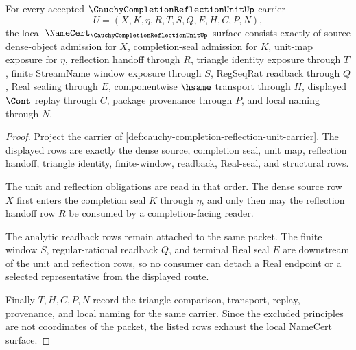 \begin{theorem}
\label{thm:cauchy-completion-reflection-unit-namecert-obligations}
For every accepted $\CauchyCompletionReflectionUnitUp$ carrier
$$
U=(X,K,\eta,R,T,S,Q,E,H,C,P,N),
$$
the local $\NameCert_{\CauchyCompletionReflectionUnitUp}$ surface consists exactly of source dense-object admission for $X$, completion-seal admission for $K$, unit-map exposure for $\eta$, reflection handoff through $R$, triangle identity exposure through $T$, finite StreamName window exposure through $S$, RegSeqRat readback through $Q$, Real sealing through $E$, componentwise $\hsame$ transport through $H$, displayed $\Cont$ replay through $C$, package provenance through $P$, and local naming through $N$.
\end{theorem}
\begin{proof}
Project the carrier of \autoref{def:cauchy-completion-reflection-unit-carrier}. The displayed rows are exactly the dense source, completion seal, unit map, reflection handoff, triangle identity, finite-window, readback, Real-seal, and structural rows.

The unit and reflection obligations are read in that order. The dense source row $X$ first enters the completion seal $K$ through $\eta$, and only then may the reflection handoff row $R$ be consumed by a completion-facing reader.

The analytic readback rows remain attached to the same packet. The finite window $S$, regular-rational readback $Q$, and terminal Real seal $E$ are downstream of the unit and reflection rows, so no consumer can detach a Real endpoint or a selected representative from the displayed route.

Finally $T,H,C,P,N$ record the triangle comparison, transport, replay, provenance, and local naming for the same carrier. Since the excluded principles are not coordinates of the packet, the listed rows exhaust the local NameCert surface.
\end{proof}

